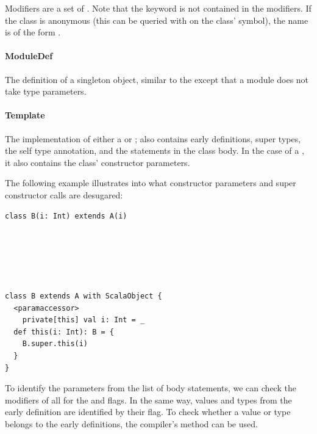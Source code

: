 Modifiers are a set of . Note that the  keyword is not contained in the modifiers. If the class is anonymous (this can be queried with  on the class' symbol), the name is of the form .

\paragraph{ModuleDef} 

\noindent The definition of a singleton object, similar to the  except that a module does not take type parameters. 

\paragraph{Template} 

\noindent The implementation of either a  or ; also contains early definitions, super types, the self type annotation, and the statements in the class body. In the case of a , it also contains the class' constructor parameters.

The following example illustrates into what constructor parameters and super constructor calls are desugared:

\begin{multicols}{2}
\begin{lstlisting}
class B(i: Int) extends A(i)






\end{lstlisting}
\begin{lstlisting}
class B extends A with ScalaObject {
  <paramaccessor> 
    private[this] val i: Int = _
  def this(i: Int): B = {
    B.super.this(i)
  }
}
\end{lstlisting}
\end{multicols}

To identify the parameters from the list of body statements, we can check the modifiers of all  for the \textsc{} and \textsc{} flags. In the same way, values and types from the early definition are identified by their \textsc{} flag. To check whether a value or type belongs to the early definitions, the compiler's  method can be used.

